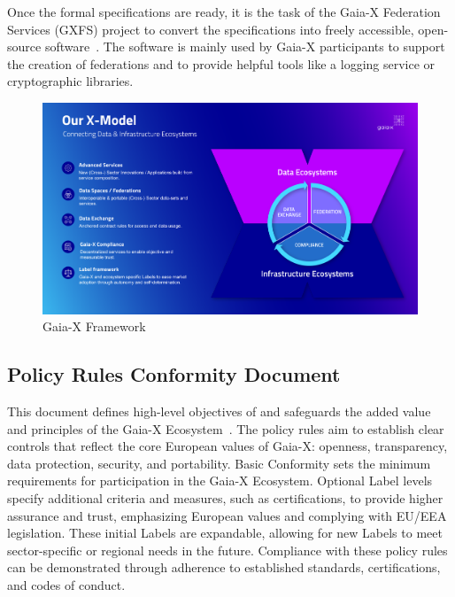 Once the formal specifications are ready, it is the task of the Gaia-X Federation Services (GXFS) project to convert the specifications into freely accessible, open-source software~\cite{gxfs}.
The software is mainly used by Gaia-X participants to support the creation of federations and to provide helpful tools like a logging service or cryptographic libraries.

\begin{figure}
    \centering
    \includegraphics[width=\textwidth]{figures/x-model.png}
    \caption{Gaia-X Framework~\cite{gaiax}}\label{fig:gaiax-x-model}
\end{figure}

\subsection{Policy Rules Conformity Document}\label{subsec:policy-rules-conformity-document}

This document defines high-level objectives of and safeguards the added value and principles of the Gaia-X Ecosystem~\cite{gaiax_policy_rules}.
The policy rules aim to establish clear controls that reflect the core European values of Gaia-X: openness, transparency, data protection, security, and portability.
Basic Conformity sets the minimum requirements for participation in the Gaia-X Ecosystem.
Optional Label levels specify additional criteria and measures, such as certifications, to provide higher assurance and trust, emphasizing European values and complying with EU/EEA legislation.
These initial Labels are expandable, allowing for new Labels to meet sector-specific or regional needs in the future.
Compliance with these policy rules can be demonstrated through adherence to established standards, certifications, and codes of conduct.

